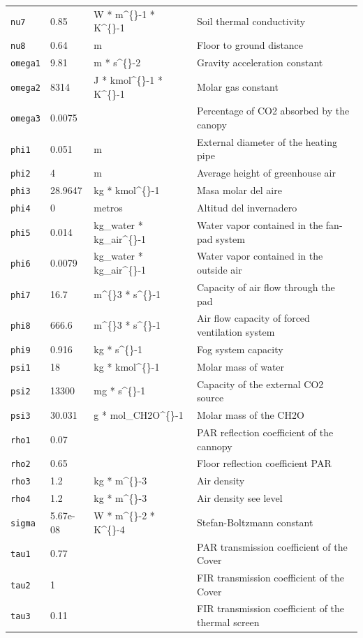 \documentclass[11pt,a4paper]{article}
\begin{document}
\begin{longtable}{@{}p{} p{} p{} p{}@{}}
\texttt{nu7} & 0.85 & W * m\textasciicircum\{\}-1 * K\textasciicircum\{\}-1 & Soil thermal conductivity\\
\texttt{nu8} & 0.64 & m & Floor to ground distance\\
\texttt{omega1} & 9.81 & m * s\textasciicircum\{\}-2 & Gravity acceleration constant\\
\texttt{omega2} & 8314 & J * kmol\textasciicircum\{\}-1 * K\textasciicircum\{\}-1 & Molar gas constant\\
\texttt{omega3} & 0.0075 &  & Percentage of CO2 absorbed by the canopy\\
\texttt{phi1} & 0.051 & m & External diameter of the heating pipe\\
\texttt{phi2} & 4 & m & Average height of greenhouse air\\
\texttt{phi3} & 28.9647 & kg * kmol\textasciicircum\{\}-1 & Masa molar del aire\\
\texttt{phi4} & 0 & metros & Altitud del invernadero\\
\texttt{phi5} & 0.014 & kg\_water * kg\_air\textasciicircum\{\}-1 & Water vapor contained in the fan-pad system\\
\texttt{phi6} & 0.0079 & kg\_water * kg\_air\textasciicircum\{\}-1 & Water vapor contained in the outside air\\
\texttt{phi7} & 16.7 & m\textasciicircum\{\}3 * s\textasciicircum\{\}-1 & Capacity of air flow through the pad\\
\texttt{phi8} & 666.6 & m\textasciicircum\{\}3 * s\textasciicircum\{\}-1 & Air flow capacity of forced ventilation system\\
\texttt{phi9} & 0.916 & kg * s\textasciicircum\{\}-1 & Fog system capacity\\
\texttt{psi1} & 18 & kg * kmol\textasciicircum\{\}-1 & Molar mass of water\\
\texttt{psi2} & 13300 & mg * s\textasciicircum\{\}-1 & Capacity of the external CO2 source\\
\texttt{psi3} & 30.031 & g * mol\_CH2O\textasciicircum\{\}-1 & Molar mass of the CH2O\\
\texttt{rho1} & 0.07 &  & PAR reflection coefficient of the cannopy\\
\texttt{rho2} & 0.65 &  & Floor reflection coefficient PAR\\
\texttt{rho3} & 1.2 & kg * m\textasciicircum\{\}-3 & Air density\\
\texttt{rho4} & 1.2 & kg * m\textasciicircum\{\}-3 & Air density see level\\
\texttt{sigma} & 5.67e-08 & W * m\textasciicircum\{\}-2 * K\textasciicircum\{\}-4 & Stefan-Boltzmann constant\\
\texttt{tau1} & 0.77 &  & PAR transmission coefficient of the Cover\\
\texttt{tau2} & 1 &  & FIR transmission coefficient of the Cover\\
\texttt{tau3} & 0.11 &  & FIR transmission coefficient of the thermal screen\\
\bottomrule
\end{longtable}
\end{document}
